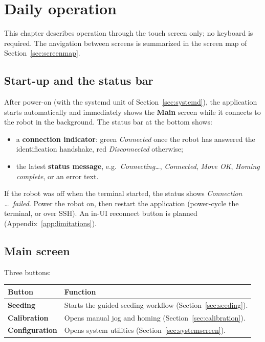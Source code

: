 \chapter{Daily operation}
\label{ch:usage}

This chapter describes operation through the touch screen only; no keyboard is
required. The navigation between screens is summarized in the screen map of
Section~\ref{sec:screenmap}.

\section{Start-up and the status bar}

After power-on (with the systemd unit of Section~\ref{sec:systemd}), the application
starts automatically and immediately shows the \textbf{Main} screen while it connects
to the robot in the background. The status bar at the bottom shows:

\begin{itemize}[itemsep=2pt]
  \item a \textbf{connection indicator}: green \emph{Connected} once the robot has
        answered the identification handshake, red \emph{Disconnected} otherwise;
  \item the latest \textbf{status message}, e.g.\ \emph{Connecting\dots},
        \emph{Connected}, \emph{Move OK}, \emph{Homing complete}, or an error text.
\end{itemize}

\begin{note}
If the robot was off when the terminal started, the status shows
\emph{Connection \dots\ failed}. Power the robot on, then restart the application
(power-cycle the terminal, or  over SSH).
An in-UI reconnect button is planned (Appendix~\ref{app:limitations}).
\end{note}

\section{Main screen}

Three buttons:

\begin{center}
\begin{tabularx}{\textwidth}{@{}lX@{}}
  \toprule
  \textbf{Button} & \textbf{Function} \\
  \midrule
  \textbf{Seeding} & Starts the guided seeding workflow (Section~\ref{sec:seeding}). \\
  \textbf{Calibration} & Opens manual jog and homing (Section~\ref{sec:calibration}). \\
  \textbf{Configuration} & Opens system utilities (Section~\ref{sec:systemscreen}). \\
  \bottomrule
\end{tabularx}
\end{center}

